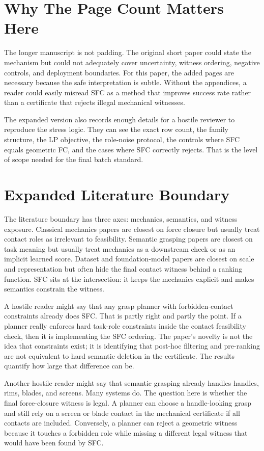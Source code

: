 \documentclass{article}
\begin{document}
\section{Why The Page Count Matters Here}

The longer manuscript is not padding. The original short paper could state the mechanism but could not adequately cover uncertainty, witness ordering, negative controls, and deployment boundaries. For this paper, the added pages are necessary because the safe interpretation is subtle. Without the appendices, a reader could easily misread SFC as a method that improves success rate rather than a certificate that rejects illegal mechanical witnesses.

The expanded version also records enough details for a hostile reviewer to reproduce the stress logic. They can see the exact row count, the family structure, the LP objective, the role-noise protocol, the controls where SFC equals geometric FC, and the cases where SFC correctly rejects. That is the level of scope needed for the final batch standard.

\section{Expanded Literature Boundary}

The literature boundary has three axes: mechanics, semantics, and witness exposure. Classical mechanics papers are closest on force closure but usually treat contact roles as irrelevant to feasibility. Semantic grasping papers are closest on task meaning but usually treat mechanics as a downstream check or as an implicit learned score. Dataset and foundation-model papers are closest on scale and representation but often hide the final contact witness behind a ranking function. SFC sits at the intersection: it keeps the mechanics explicit and makes semantics constrain the witness.

A hostile reader might say that any grasp planner with forbidden-contact constraints already does SFC. That is partly right and partly the point. If a planner really enforces hard task-role constraints inside the contact feasibility check, then it is implementing the SFC ordering. The paper's novelty is not the idea that constraints exist; it is identifying that post-hoc filtering and pre-ranking are not equivalent to hard semantic deletion in the certificate. The results quantify how large that difference can be.

Another hostile reader might say that semantic grasping already handles handles, rims, blades, and screens. Many systems do. The question here is whether the final force-closure witness is legal. A planner can choose a handle-looking grasp and still rely on a screen or blade contact in the mechanical certificate if all contacts are included. Conversely, a planner can reject a geometric witness because it touches a forbidden role while missing a different legal witness that would have been found by SFC.
\end{document}
